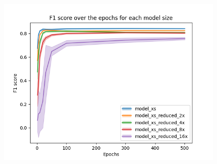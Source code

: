 \begin{figure}[!htbp]
\begin{minipage}[t]{.5\textwidth}
      \label{fig:yolov8_visulization_recall_reduced_models}
    \end{minipage}
\end{figure}

\begin{figure}[!htbp]
    \centering
    \begin{minipage}[t]{.5\textwidth}%
      \centering
      \includegraphics[width=1.1\linewidth]{Figures/results/yolov8/f1_score_over_epochs_reduced_models.png}
      \label{fig:yolov8_visulization_f1_score_reduced_models}
    \end{minipage}%
\end{figure}

